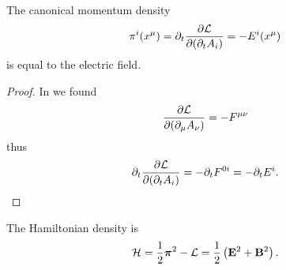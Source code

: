 \begin{lemma}\label{thm:mw_coulomb_canonical_momentum}
	The canonical momentum density
	\begin{equation}
		\pi^i(x^\mu)
		=
		\partial_t
		\pdv{\mathcal{L}}{(\partial_tA_i)}
		=
		-
		E^i(x^\mu)
		\label{eq:mw_coulomb_canonical_momentum}
	\end{equation}
	is equal to the electric field.
\end{lemma}
\begin{proof}
	In  we found
	\begin{equation*}
		\pdv{\mathcal{L}}{(\partial_\mu A_\nu)}
		=
		-
		F^{\mu\nu}
	\end{equation*}
	thus
	\begin{equation*}
		\partial_t
		\pdv{\mathcal{L}}{(\partial_tA_i)}
		=
		-
		\partial_t
		F^{0i}
		=
		-
		\partial_t
		E^i
		.
	\end{equation*}
\end{proof}

\begin{corollary}\label{thm:mw_coulomb_hamiltonian}
	The Hamiltonian density is
	\begin{equation}
		\mathcal{H}
		=
		\frac{1}{2}
		\boldsymbol{\pi}^2
		-
		\mathcal{L}
		=
		\frac{1}{2}
		\left(
			\vb{E}^2
			+
			\vb{B}^2
		\right)
		\label{thm:mw_hamiltonian}
		.
	\end{equation}
\end{corollary}

